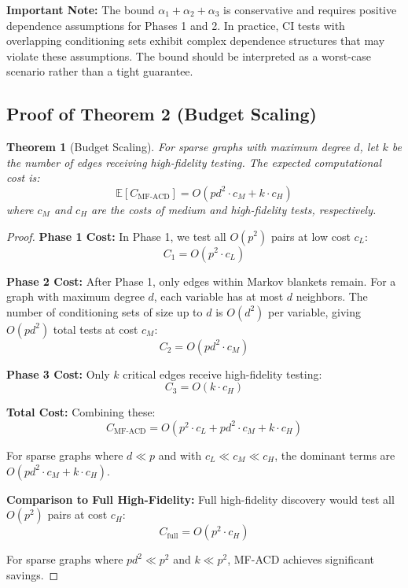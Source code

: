 \documentclass{article}
\newtheorem{theorem}{Theorem}
\begin{document}
\textbf{Important Note:} The bound $\alpha_1 + \alpha_2 + \alpha_3$ is conservative and requires positive dependence assumptions for Phases 1 and 2. In practice, CI tests with overlapping conditioning sets exhibit complex dependence structures that may violate these assumptions. The bound should be interpreted as a worst-case scenario rather than a tight guarantee.

\subsection{Proof of Theorem 2 (Budget Scaling)}

\begin{theorem}[Budget Scaling]
For sparse graphs with maximum degree $d$, let $k$ be the number of edges receiving high-fidelity testing. The expected computational cost is:
\begin{equation}
\mathbb{E}[C_{\text{MF-ACD}}] = O(pd^2 \cdot c_M + k \cdot c_H)
\end{equation}
where $c_M$ and $c_H$ are the costs of medium and high-fidelity tests, respectively.
\end{theorem}

\begin{proof}
\textbf{Phase 1 Cost:} In Phase 1, we test all $O(p^2)$ pairs at low cost $c_L$:
\begin{equation}
C_1 = O(p^2 \cdot c_L)
\end{equation}

\textbf{Phase 2 Cost:} After Phase 1, only edges within Markov blankets remain. For a graph with maximum degree $d$, each variable has at most $d$ neighbors. The number of conditioning sets of size up to $d$ is $O(d^2)$ per variable, giving $O(pd^2)$ total tests at cost $c_M$:
\begin{equation}
C_2 = O(pd^2 \cdot c_M)
\end{equation}

\textbf{Phase 3 Cost:} Only $k$ critical edges receive high-fidelity testing:
\begin{equation}
C_3 = O(k \cdot c_H)
\end{equation}

\textbf{Total Cost:} Combining these:
\begin{equation}
C_{\text{MF-ACD}} = O(p^2 \cdot c_L + pd^2 \cdot c_M + k \cdot c_H)
\end{equation}

For sparse graphs where $d \ll p$ and with $c_L \ll c_M \ll c_H$, the dominant terms are $O(pd^2 \cdot c_M + k \cdot c_H)$.

\textbf{Comparison to Full High-Fidelity:} Full high-fidelity discovery would test all $O(p^2)$ pairs at cost $c_H$:
\begin{equation}
C_{\text{full}} = O(p^2 \cdot c_H)
\end{equation}

For sparse graphs where $pd^2 \ll p^2$ and $k \ll p^2$, MF-ACD achieves significant savings.
\end{proof}
\end{document}
